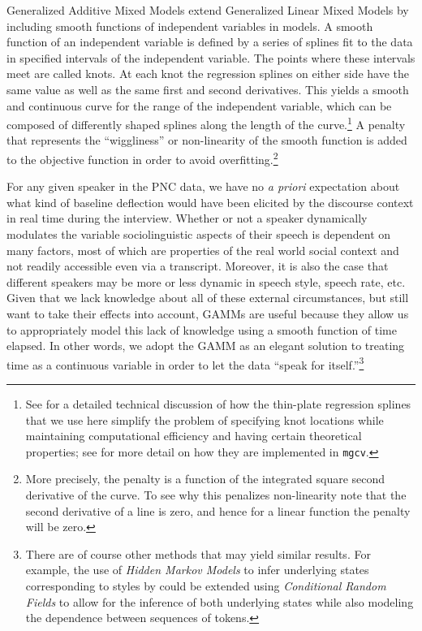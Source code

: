 \documentclass[12pt]{article}
\begin{document}
Generalized Additive Mixed Models extend Generalized Linear Mixed Models by including smooth functions of independent variables in models. A smooth function of an independent variable is defined by a series of splines fit to the data in specified intervals of the independent variable. The points where these intervals meet are called knots. At each knot the regression splines on either side have the same value as well as the same first and second derivatives. This yields a smooth and continuous curve for the range of the independent variable, which can be composed of differently shaped splines along the length of the curve.\footnote{See \cite{wood2006} for a detailed technical discussion of how the thin-plate regression splines that we use here simplify the problem of specifying knot locations while maintaining computational efficiency and having certain theoretical properties; see \cite{wood2016} for more detail on how they are implemented in \texttt{mgcv}.}  A penalty that represents the ``wiggliness'' or non-linearity of the smooth function is added to the objective function in order to avoid overfitting.\footnote{More precisely, the penalty is a function of the integrated square second derivative of the curve. To see why this penalizes non-linearity note that the second derivative of a line is zero, and hence for a linear function the penalty will be zero.}

For any given speaker in the PNC data, we have no \emph{a priori} expectation about what kind of baseline deflection would have been elicited by the discourse context in real time during the interview.  Whether or not a speaker dynamically modulates the variable sociolinguistic aspects of their speech is dependent on many factors, most of which are properties of the real world social context and not readily accessible even via a transcript. Moreover, it is also the case that different speakers may be more or less dynamic in speech style, speech rate, etc. Given that we lack knowledge about all of these external circumstances, but still want to take their effects into account, GAMMs are useful because they allow us to appropriately model this lack of knowledge using a smooth function of time elapsed. In other words, we adopt the GAMM  as an elegant solution to treating time as a continuous variable in order to let the data ``speak for itself.''\footnote{There are of course other methods that may yield similar results. For example, the use of \emph{Hidden Markov Models} to infer underlying states corresponding to styles by \citet{Ahern:2015} could be extended using \emph{Conditional Random Fields} to allow for the inference of both underlying states while also modeling the dependence between sequences of tokens.}
\end{document}
